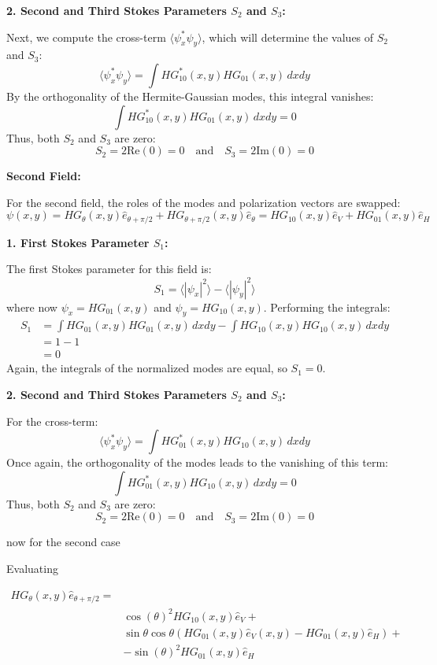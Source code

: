 \documentclass[12pt]{article}
\begin{document}
\begin{flushleft}
\textbf{2. Second and Third Stokes Parameters \( S_2 \) and \( S_3 \):}

Next, we compute the cross-term \( \langle \psi_x^* \psi_y \rangle \), which will determine the values of \( S_2 \) and \( S_3 \):
\[
\langle \psi_x^* \psi_y \rangle = \int HG_{10}^*(x, y) HG_{01}(x, y) \, dxdy
\]
By the orthogonality of the Hermite-Gaussian modes, this integral vanishes:
\[
\int HG_{10}^*(x, y) HG_{01}(x, y) \, dxdy = 0
\]
Thus, both \( S_2 \) and \( S_3 \) are zero:
\[
S_2 = 2 \text{Re}(0) = 0 \quad \text{and} \quad S_3 = 2 \text{Im}(0) = 0
\]

\textbf{Second Field:}

For the second field, the roles of the modes and polarization vectors are swapped:
\[
\psi(x, y) = HG_{\theta}(x, y) \hat{e}_{\theta + \pi/2} + HG_{\theta + \pi/2}(x, y) \hat{e}_{\theta} = HG_{10}(x, y) \hat{e}_V + HG_{01}(x, y) \hat{e}_H
\]

\textbf{1. First Stokes Parameter \( S_1 \):}

The first Stokes parameter for this field is:
\[
S_1 = \langle |\psi_x|^2 \rangle - \langle |\psi_y|^2 \rangle
\]
where now \( \psi_x = HG_{01}(x, y) \) and \( \psi_y = HG_{10}(x, y) \). Performing the integrals:
\begin{equation}
    \begin{split}
    S_1 &= \int HG_{01}(x, y) HG_{01}(x, y) \, dxdy - \int HG_{10}(x, y) HG_{10}(x, y) \, dxdy \\
    &= 1 - 1 \\
    &= 0
    \end{split}
\end{equation}
Again, the integrals of the normalized modes are equal, so \( S_1 = 0 \).

\textbf{2. Second and Third Stokes Parameters \( S_2 \) and \( S_3 \):}

For the cross-term:
\[
\langle \psi_x^* \psi_y \rangle = \int HG_{01}^*(x, y) HG_{10}(x, y) \, dxdy
\]
Once again, the orthogonality of the modes leads to the vanishing of this term:
\[
\int HG_{01}^*(x, y) HG_{10}(x, y) \, dxdy = 0
\]
Thus, both \( S_2 \) and \( S_3 \) are zero:
\[
S_2 = 2 \text{Re}(0) = 0 \quad \text{and} \quad S_3 = 2 \text{Im}(0) = 0
\]

now for the second case 

Evaluating

    \begin{align*}
     HG_{\theta}(x,y)\hat{e}_{\theta+\pi/2}=&\\
        &\cos(\theta)^2HG_{10}(x,y)\hat{e}_{V}+\\
        &\sin{\theta}\cos{\theta}(HG_{01}(x,y)\hat{e}_{V}(x,y)-HG_{01}(x,y)\hat{e}_{H})+\\
        &-\sin(\theta)^2HG_{01}(x,y)\hat{e}_{H}
    \end{align*}


\end{flushleft}
\end{document}
